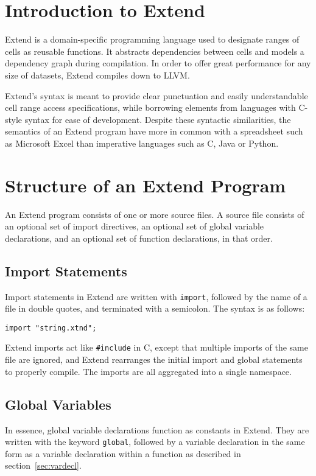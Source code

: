 \section{Introduction to Extend}
	Extend is a domain-specific programming language used to designate ranges of cells as reusable functions. It abstracts dependencies between cells and models a dependency graph during compilation. In order to offer great performance for any size of datasets, Extend compiles down to LLVM.
	
	Extend's syntax is meant to provide clear punctuation and easily understandable cell range access specifications, while borrowing elements from languages with C-style syntax for ease of development. Despite these syntactic similarities, the semantics of an Extend program have more in common with a spreadsheet such as Microsoft Excel than imperative languages such as C, Java or Python.
\section{Structure of an Extend Program}
\label{sec:Grammar}
	An Extend program consists of one or more source files. A source file consists of an optional set of import directives, an optional set of global variable declarations, and an optional set of function declarations, in that order. 
	\subsection{Import Statements}
		Import statements in Extend are written with \texttt{import}, followed by the name of a file in double quotes, and terminated with a semicolon. The syntax is as follows:
		\begin{lstlisting}
import "string.xtnd";
		\end{lstlisting}
		
		Extend imports act like \texttt{\#include} in C, except that multiple imports of the same file are ignored, and Extend rearranges the initial import and global statements to properly compile. The imports are all aggregated into a single namespace.
	\subsection{Global Variables}
		In essence, global variable declarations function as constants in Extend. They are written with the keyword \texttt{global}, followed by a variable declaration in the same form as a variable declaration within a function as described in section~\ref{sec:vardecl}. 
